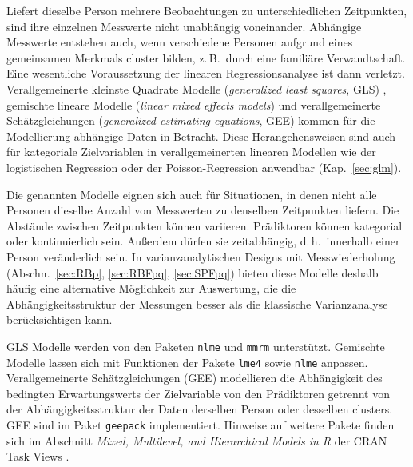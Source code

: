 
Liefert dieselbe Person mehrere Beobachtungen zu unterschiedlichen Zeitpunkten, sind ihre einzelnen Messwerte nicht unabhängig voneinander. Abhängige Messwerte entstehen auch, wenn verschiedene Personen aufgrund eines gemeinsamen Merkmals cluster bilden, z.\,B.\ durch eine familiäre Verwandtschaft. Eine wesentliche Voraussetzung der linearen Regressionsanalyse ist dann verletzt. Verallgemeinerte kleinste Quadrate Modelle (\emph{generalized least squares}, GLS) \cite{Pinheiro2000}, gemischte lineare Modelle (\emph{linear mixed effects models}) \cite{West2006} und verallgemeinerte Schätzgleichungen (\emph{generalized estimating equations}, GEE) \cite{Yan2004} kommen für die Modellierung abhängige Daten in Betracht. Diese Herangehensweisen sind auch für kategoriale Zielvariablen in verallgemeinerten linearen Modellen wie der logistischen Regression oder der Poisson-Regression anwendbar (Kap.\ \ref{sec:glm}).

Die genannten Modelle eignen sich auch für Situationen, in denen nicht alle Personen dieselbe Anzahl von Messwerten zu denselben Zeitpunkten liefern. Die Abstände zwischen Zeitpunkten können variieren. Prädiktoren können kategorial oder kontinuierlich sein. Außerdem dürfen sie zeitabhängig, d.\,h.\ innerhalb einer Person veränderlich sein. In varianzanalytischen Designs mit Messwiederholung (Abschn.\ \ref{sec:RBp}, \ref{sec:RBFpq}, \ref{sec:SPFpq}) bieten diese Modelle deshalb häufig eine alternative Möglichkeit zur Auswertung, die die Abhängigkeitsstruktur der Messungen besser als die klassische Varianzanalyse berücksichtigen kann.

GLS Modelle werden von den Paketen \lstinline!nlme! \cite{Pinheiro2008} und \lstinline!mmrm! \cite{SabanesBove2024} unterstützt. Gemischte Modelle \cite{Pinheiro2000, West2006} lassen sich mit Funktionen der Pakete \lstinline!lme4! \cite{Bates2008} sowie \lstinline!nlme! anpassen. Verallgemeinerte Schätzgleichungen (GEE) modellieren die Abhängigkeit des bedingten Erwartungswerts der Zielvariable von den Prädiktoren getrennt von der Abhängigkeitsstruktur der Daten derselben Person oder desselben clusters. GEE sind im Paket \lstinline!geepack! \cite{Hojsgaard2006} implementiert. Hinweise auf weitere Pakete finden sich im Abschnitt \emph{Mixed, Multilevel, and Hierarchical Models in R} der CRAN Task Views \cite{CRANtvMixed}.

